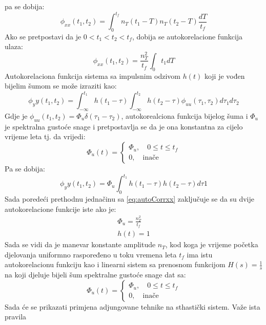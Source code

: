 pa se dobija:
\begin{equation}
    \phi_{xx}(t_1,t_2)=\int_{0}^{t_f}n_T(t_1-T)n_T(t_2-T)\frac{dT}{t_f}
\end{equation}
Ako se pretpostavi da je $0<t_1<t_2<t_f$, dobija se autokorelacione funkcija ulaza:
\begin{equation}
    \phi_{xx}(t_1,t_2)=\frac{n_T^2}{t_f}\int_{0}{t_1}dT
    \label{eq:autoCorrxx}
\end{equation}
Autokorelaciona funkcija sistema sa impulsnim odzivom $h(t)$ koji je vođen bijelim 
šumom se može izraziti kao:
\begin{equation}
    \phi_yy(t_1,t_2)=\int_{-\infty}^{t_1}h(t_1-\tau)\int_{-\infty}^{t_2}h(t_2-\tau)\phi_{uu}(\tau_1,\tau_2)d\tau_1d\tau_2
\end{equation}
Gdje je $\phi_{uu}(t_1,t_2)= \Phi_u\delta(\tau_1-\tau_2)$, autokorealciona funkcija bijelog šuma
i $\Phi_u$ je spektralna gustoće snage i pretpostavlja se da je ona konstantna za cijelo vrijeme leta tj. da vrijedi:
\begin{equation}
    \Phi_u(t) = \begin{cases}
        \Phi_u, \quad 0 \leq t \leq t_f \\
        0, \quad \text{inače} 
    \end{cases}
\end{equation}
Pa se dobija:
\begin{equation}
    \phi_yy(t_1,t_2) = \Phi_u\int_0^{t_1}h(t_1-\tau)h(t_2-\tau)d\tau1
\end{equation}
Sada poredeći prethodnu jednačinu sa \ref{eq:autoCorrxx} zaključuje se da 
su dvije autokorelacione funkcije iste ako je: 
\begin{eqnarray}
    \Phi_u =\frac{n_T^2}{t_f} \\
    h(t)=1
\end{eqnarray}
Sada se vidi da je manevar konstante amplitude $n_T$, kod koga je vrijeme 
početka djelovanja uniformno raspoređeno u toku vremena leta $t_f$ ima istu 
autokorelacionu funkciju kao i linearni sistem sa prenosnom funkcijom $H(s)=\frac{1}{s}$ 
na koji djeluje bijeli šum spektralne gustoće snage dat sa: 
\begin{equation*}
    \Phi_u(t) = \begin{cases}
        \Phi_u, \quad 0 \leq t \leq t_f \\
        0, \quad \text{inače}
    \end{cases}
\end{equation*}
Sada će se prikazati primjena adjungovane tehnike na sthastički sistem. Važe ista pravila 
